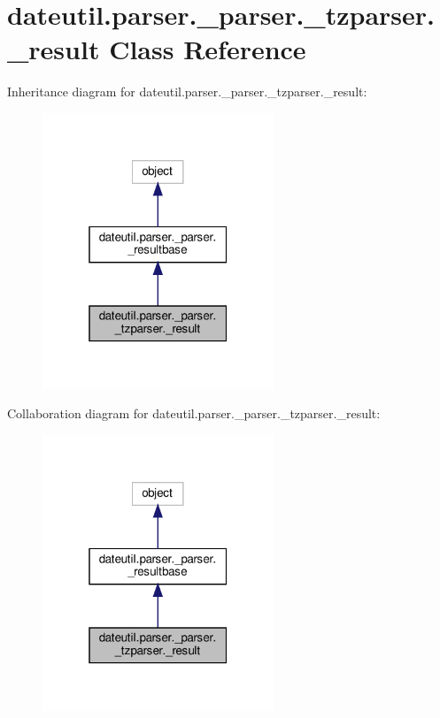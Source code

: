 \hypertarget{classdateutil_1_1parser_1_1__parser_1_1__tzparser_1_1__result}{}\section{dateutil.\+parser.\+\_\+parser.\+\_\+tzparser.\+\_\+result Class Reference}
\label{classdateutil_1_1parser_1_1__parser_1_1__tzparser_1_1__result}


Inheritance diagram for dateutil.\+parser.\+\_\+parser.\+\_\+tzparser.\+\_\+result\+:
\nopagebreak
\begin{figure}[H]
\begin{center}
\leavevmode
\includegraphics[width=196pt]{classdateutil_1_1parser_1_1__parser_1_1__tzparser_1_1__result__inherit__graph}
\end{center}
\end{figure}


Collaboration diagram for dateutil.\+parser.\+\_\+parser.\+\_\+tzparser.\+\_\+result\+:
\nopagebreak
\begin{figure}[H]
\begin{center}
\leavevmode
\includegraphics[width=196pt]{classdateutil_1_1parser_1_1__parser_1_1__tzparser_1_1__result__coll__graph}
\end{center}
\end{figure}

